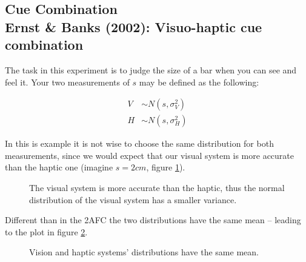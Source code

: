 \documentclass[../main/Notes.tex]{subfiles}
\begin{document}
\subsection[Cue Combination]{Cue Combination\\Ernst \& Banks (2002): Visuo-haptic cue combination}
The task in this experiment is to judge the size of a bar when you can see and feel it. Your two measurements of $s$ may be defined as the following:

\begin{align*}
V &\sim N\left(s,\sigma_{V}^{2}\right)\\
H &\sim N\left(s,\sigma_{H}^{2}\right)
\end{align*}

In this is example it is not wise to choose the same distribution for both measurements, since we would expect that our visual system is more accurate than the haptic one (imagine $s=2cm$, figure \ref{fig:2014-06-20_visionhaptics}).
\begin{figure}[ht!]
  \centering
  \caption{The visual system is more accurate than the haptic, thus the normal distribution of the visual system has a smaller variance.}
  \label{fig:2014-06-20_visionhaptics}
\end{figure}

Different than in the 2AFC the two distributions have the same mean -- leading to the plot in figure \ref{fig:2014-06-20_visionhaptics2d}.

\begin{figure}[ht!]
  \centering
  \caption{Vision and haptic systems' distributions have the same mean.}
  \label{fig:2014-06-20_visionhaptics2d}
\end{figure}
\end{document}
